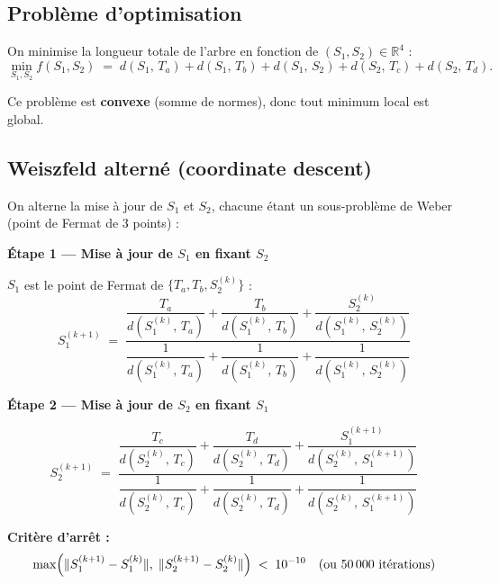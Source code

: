 \documentclass[12pt, a4paper]{article}
\newcommand{\dist}[2]{d\!\left(#1,\,#2\right)}
\begin{document}
\subsection{Problème d'optimisation}

On minimise la longueur totale de l'arbre en fonction de $(S_1, S_2) \in \mathbb{R}^4$ :
\begin{equation}
\label{eq:objective}
    \min_{S_1, S_2} f(S_1, S_2) \;=\;
    \dist{S_1}{T_a} + \dist{S_1}{T_b} + \dist{S_1}{S_2}
    + \dist{S_2}{T_c} + \dist{S_2}{T_d}.
\end{equation}

Ce problème est \textbf{convexe} (somme de normes), donc tout minimum local est global.

\subsection{Weiszfeld alterné (coordinate descent)}

On alterne la mise à jour de $S_1$ et $S_2$, chacune étant un sous-problème de
Weber (point de Fermat de 3 points) :

\bigskip

\textbf{Étape 1 — Mise à jour de $S_1$ en fixant $S_2$}

$S_1$ est le point de Fermat de $\{T_a, T_b, S_2^{(k)}\}$ :
\begin{equation}
\label{eq:update_s1}
    S_1^{(k+1)} \;=\;
    \frac{\dfrac{T_a}{\dist{S_1^{(k)}}{T_a}}
        + \dfrac{T_b}{\dist{S_1^{(k)}}{T_b}}
        + \dfrac{S_2^{(k)}}{\dist{S_1^{(k)}}{S_2^{(k)}}}}
         {\dfrac{1}{\dist{S_1^{(k)}}{T_a}}
        + \dfrac{1}{\dist{S_1^{(k)}}{T_b}}
        + \dfrac{1}{\dist{S_1^{(k)}}{S_2^{(k)}}}}
\end{equation}

\textbf{Étape 2 — Mise à jour de $S_2$ en fixant $S_1$}

\begin{equation}
\label{eq:update_s2}
    S_2^{(k+1)} \;=\;
    \frac{\dfrac{T_c}{\dist{S_2^{(k)}}{T_c}}
        + \dfrac{T_d}{\dist{S_2^{(k)}}{T_d}}
        + \dfrac{S_1^{(k+1)}}{\dist{S_2^{(k)}}{S_1^{(k+1)}}}}
         {\dfrac{1}{\dist{S_2^{(k)}}{T_c}}
        + \dfrac{1}{\dist{S_2^{(k)}}{T_d}}
        + \dfrac{1}{\dist{S_2^{(k)}}{S_1^{(k+1)}}}}
\end{equation}

\textbf{Critère d'arrêt :}
\[
    \max\!\left(
        \|S_1^{(k+1)} - S_1^{(k)}\|,\;
        \|S_2^{(k+1)} - S_2^{(k)}\|
    \right) \;<\; 10^{-10}
    \quad \text{(ou 50\,000 itérations)}
\]
\end{document}
